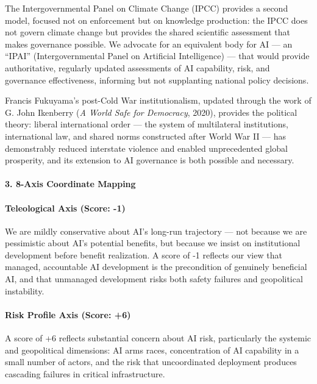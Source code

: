 The Intergovernmental Panel on Climate Change (IPCC) provides a second
model, focused not on enforcement but on knowledge production: the IPCC
does not govern climate change but provides the shared scientific
assessment that makes governance possible. We advocate for an equivalent
body for AI --- an ``IPAI'' (Intergovernmental Panel on Artificial
Intelligence) --- that would provide authoritative, regularly updated
assessments of AI capability, risk, and governance effectiveness,
informing but not supplanting national policy decisions.

Francis Fukuyama's post-Cold War institutionalism, updated through the
work of G. John Ikenberry (\emph{A World Safe for Democracy}, 2020),
provides the political theory: liberal international order --- the
system of multilateral institutions, international law, and shared norms
constructed after World War II --- has demonstrably reduced interstate
violence and enabled unprecedented global prosperity, and its extension
to AI governance is both possible and necessary.

\paragraph{3. 8-Axis Coordinate
Mapping}\label{axis-coordinate-mapping-4}

\paragraph{Teleological Axis (Score:
-1)}\label{teleological-axis-score--1}

We are mildly conservative about AI's long-run trajectory --- not
because we are pessimistic about AI's potential benefits, but because we
insist on institutional development before benefit realization. A score
of -1 reflects our view that managed, accountable AI development is the
precondition of genuinely beneficial AI, and that unmanaged development
risks both safety failures and geopolitical instability.

\paragraph{Risk Profile Axis (Score:
+6)}\label{risk-profile-axis-score-6}

A score of +6 reflects substantial concern about AI risk, particularly
the systemic and geopolitical dimensions: AI arms races, concentration
of AI capability in a small number of actors, and the risk that
uncoordinated deployment produces cascading failures in critical
infrastructure.

